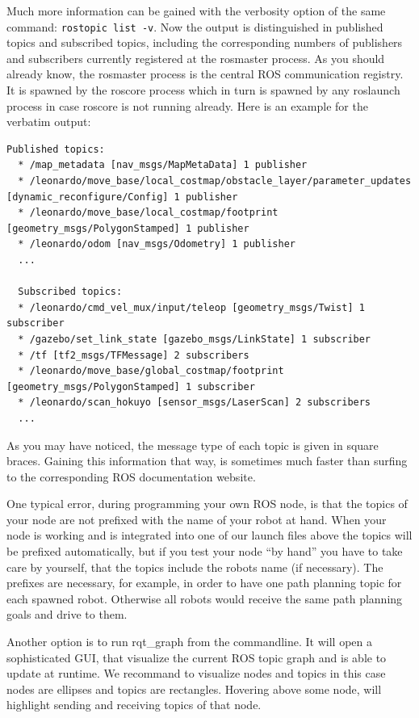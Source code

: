 Much more information can be gained with the verbosity option of the same command: \verb$rostopic list -v$. Now the output is distinguished in published topics and subscribed topics, including the corresponding numbers of publishers and subscribers currently registered at the rosmaster process. As you should already know, the rosmaster process is the central ROS communication registry. It is spawned by the roscore process which in turn is spawned by any roslaunch process in case roscore is not running already. Here is an example for the verbatim output:


\begin{Verbatim}[fontsize=\scriptsize]
  Published topics:
  * /map_metadata [nav_msgs/MapMetaData] 1 publisher
  * /leonardo/move_base/local_costmap/obstacle_layer/parameter_updates [dynamic_reconfigure/Config] 1 publisher
  * /leonardo/move_base/local_costmap/footprint [geometry_msgs/PolygonStamped] 1 publisher
  * /leonardo/odom [nav_msgs/Odometry] 1 publisher
  ...
  
  Subscribed topics:
  * /leonardo/cmd_vel_mux/input/teleop [geometry_msgs/Twist] 1 subscriber
  * /gazebo/set_link_state [gazebo_msgs/LinkState] 1 subscriber
  * /tf [tf2_msgs/TFMessage] 2 subscribers
  * /leonardo/move_base/global_costmap/footprint [geometry_msgs/PolygonStamped] 1 subscriber
  * /leonardo/scan_hokuyo [sensor_msgs/LaserScan] 2 subscribers
  ...
\end{Verbatim}

As you may have noticed, the message type of each topic is given in square braces. Gaining this information that way, is sometimes much faster than surfing to the corresponding ROS documentation website.

One typical error, during programming your own ROS node, is that the topics of your node are not prefixed with the name of your robot at hand. When your node is working and is integrated into one of our launch files above the topics will be prefixed automatically, but if you test your node ``by hand'' you have to take care by yourself, that the topics include the robots name (if necessary). The prefixes are necessary, for example, in order to have one path planning topic for each spawned robot. Otherwise all robots would receive the same path planning goals and drive to them. 

Another option is to run rqt\_graph from the commandline. It will open a sophisticated GUI, that visualize the current ROS topic graph and is able to update at runtime. We recommand to visualize nodes and topics \textendash in this case nodes are ellipses and topics are rectangles. Hovering above some node, will highlight sending and receiving topics of that node.

